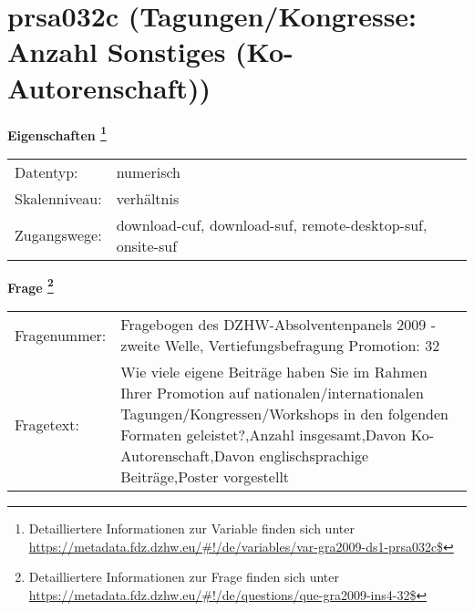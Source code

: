 
    \setcounter{footnote}{0}

    \vspace*{-1.8cm}
	\section{prsa032c (Tagungen/Kongresse: Anzahl Sonstiges (Ko-Autorenschaft))}
	\label{section:prsa032c}



    \vspace*{0.5cm}
    \noindent\textbf{Eigenschaften
	\footnote{Detailliertere Informationen zur Variable finden sich unter
		\url{https://metadata.fdz.dzhw.eu/\#!/de/variables/var-gra2009-ds1-prsa032c$}}}\\
	\begin{tabularx}{\hsize}{@{}lX}
	Datentyp: & numerisch \\
	Skalenniveau: & verhältnis \\
	Zugangswege: &
	  download-cuf, 
	  download-suf, 
	  remote-desktop-suf, 
	  onsite-suf
 \\
    \end{tabularx}



				\vspace*{0.5cm}
                \noindent\textbf{Frage
	                \footnote{Detailliertere Informationen zur Frage finden sich unter
		              \url{https://metadata.fdz.dzhw.eu/\#!/de/questions/que-gra2009-ins4-32$}}}\\
				\begin{tabularx}{\hsize}{@{}lX}
					Fragenummer: &
					  Fragebogen des DZHW-Absolventenpanels 2009 - zweite Welle, Vertiefungsbefragung Promotion:
					  32
 \\
					Fragetext: & Wie viele eigene Beiträge haben Sie im Rahmen Ihrer Promotion auf nationalen/internationalen Tagungen/Kongressen/Workshops in den folgenden Formaten geleistet?,Anzahl insgesamt,Davon Ko-Autorenschaft,Davon englischsprachige Beiträge,Poster vorgestellt \\
				\end{tabularx}





